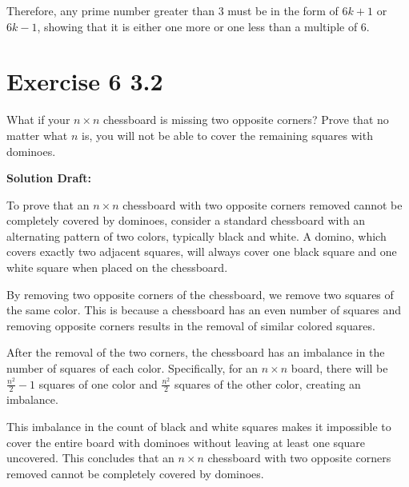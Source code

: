 \documentclass{article}
\begin{document}
Therefore, any prime number greater than 3 must be in the form of \(6k+1\) or \(6k-1\), showing that it is either one more or one less than a multiple of 6.


\section*{Exercise 6 3.2}  

What if your \(n\times n\) chessboard is missing two opposite corners? Prove that no matter what \(n\) is, you will not be able to cover the remaining squares with dominoes.

\vspace{0.5cm}
\noindent\textbf{Solution Draft:} 
\vspace{0.2cm}

To prove that an $n \times n$ chessboard with two opposite corners removed cannot be completely covered by dominoes, consider a standard chessboard with an alternating pattern of two colors, typically black and white. A domino, which covers exactly two adjacent squares, will always cover one black square and one white square when placed on the chessboard.

By removing two opposite corners of the chessboard, we remove two squares of the same color. This is because a chessboard has an even number of squares and removing opposite corners results in the removal of similar colored squares.

After the removal of the two corners, the chessboard has an imbalance in the number of squares of each color. Specifically, for an $n \times n$ board, there will be $\frac{n^2}{2} - 1$ squares of one color and $\frac{n^2}{2}$ squares of the other color, creating an imbalance.

This imbalance in the count of black and white squares makes it impossible to cover the entire board with dominoes without leaving at least one square uncovered. This concludes that an $n \times n$ chessboard with two opposite corners removed cannot be completely covered by dominoes.


\end{document}
